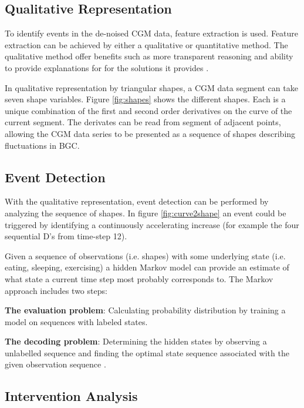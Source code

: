 

\subsection{Qualitative Representation}

To identify events in the de-noised CGM data, feature extraction is used.
Feature extraction can be achieved by either a qualitative or quantitative method.
The qualitative method offer benefits such as more transparent reasoning and ability to provide explanations for for the solutions it provides \parencite{Ven2003}.

In qualitative representation by triangular shapes, a CGM data segment can take seven shape variables.
Figure \ref{fig:shapes} shows the different shapes.
Each is a unique combination of the first and second order derivatives on the curve of the current segment.
The derivates can be read from segment of adjacent points, allowing the CGM data series to be presented as a sequence of shapes describing fluctuations in BGC.



\subsection{Event Detection}

With the qualitative representation, event detection can be performed by analyzing the sequence of shapes.
In figure \ref{fig:curve2shape} an event could be triggered by identifying a continuously accelerating increase (for example the four sequential D's from time-step 12).



Given a sequence of observations (i.e. shapes) with some underlying state (i.e. eating, sleeping, exercising) a hidden Markov model can provide an estimate of what state a current time step most probably corresponds to. The Markov approach includes two steps:

\textbf{The evaluation problem}: Calculating probability distribution by training a model on sequences with labeled states.

\textbf{The decoding problem}: Determining the hidden states by observing a unlabelled sequence and finding the optimal state sequence associated with the given observation sequence \parencite{rabiner1989}.

\subsection{Intervention Analysis}

